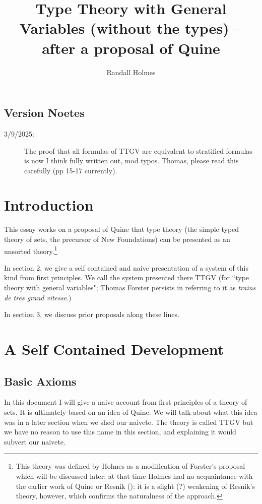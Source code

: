 \documentclass[12pt]{article}
\title{Type Theory with General Variables (without the types) -- after a proposal of Quine}
\author{Randall Holmes}
\begin{document}
\maketitle

\subsection{Version Noetes}

\begin{description}

\item[3/9/2025:]  The proof that all formulas of TTGV are equivalent to stratified formulas is now I think fully written out, mod typos.  Thomas, please read this carefully (pp 15-17 currently).

\end{description}

\section{Introduction}

This essay works on a proposal of Quine that type theory (the simple typed theory of sets, the precursor of New Foundations) can be presented as an unsorted theory.\footnote{This theory was defined by Holmes as a modification of Forster's proposal which will be discussed later; at that time Holmes had no acquaintance with the earlier work of Quine or Resnik (\cite{resnikttgv}):  it is a slight (?) weakening of Resnik's theory, however, which confirms the naturalness of the approach.}

In section 2, we give a self contained and naive presentation of a system of this kind from first principles.  We call the system presented there TTGV (for ``type theory with general variables";  Thomas Forster persists in referring to it as {\em trains de tres grand vitesse\/}.)

In section 3, we discuss prior proposals along these lines.

\section{A Self Contained Development}

\subsection{Basic Axioms}

In this document I will give a naive account from first principles of a theory of sets.  It is ultimately based on an idea of Quine.  We will talk about what this idea was in a later section when we shed our naivete.  The theory is called TTGV but we have no reason to use this name in this section, and explaining it would subvert our naivete.
\end{document}
